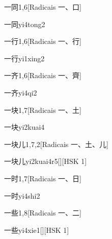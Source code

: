 \begin{entry}{一同}{1,6}[Radicais ⼀、⼝]
  \begin{phonetics}{一同}{yi4tong2}
  \end{phonetics}
\end{entry}

\begin{entry}{一行}{1,6}[Radicais ⼀、⾏]
  \begin{phonetics}{一行}{yi1xing2}
  \end{phonetics}
\end{entry}

\begin{entry}{一齐}{1,6}[Radicais ⼀、⿑]
  \begin{phonetics}{一齐}{yi4qi2}
  \end{phonetics}
\end{entry}

\begin{entry}{一块}{1,7}[Radicais ⼀、⼟]
  \begin{phonetics}{一块}{yi2kuai4}
  \end{phonetics}
\end{entry}

\begin{entry}{一块儿}{1,7,2}[Radicais ⼀、⼟、⼉]
  \begin{phonetics}{一块儿}{yi2kuai4r5}[][HSK 1]
  \end{phonetics}
\end{entry}

\begin{entry}{一时}{1,7}[Radicais ⼀、⽇]
  \begin{phonetics}{一时}{yi4shi2}
  \end{phonetics}
\end{entry}

\begin{entry}{一些}{1,8}[Radicais ⼀、⼆]
  \begin{phonetics}{一些}{yi4xie1}[][HSK 1]
  \end{phonetics}
\end{entry}


